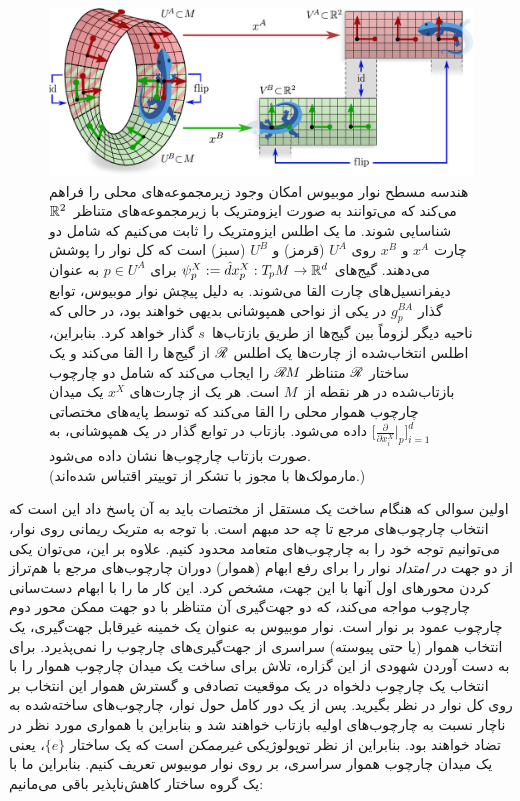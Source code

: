 \begin{figure}[H]
	\centering
	\includegraphics[width=\columnwidth]{figures/mobius_conv_gauges.pdf}
	\vspace*{.5ex}
	\caption{\small
		هندسه مسطح نوار موبیوس امکان وجود زیرمجموعه‌های محلی را فراهم می‌کند که می‌توانند به صورت ایزومتریک با زیرمجموعه‌های متناظر~$\mathbb{R}^2$ شناسایی شوند.
		ما یک اطلس ایزومتریک را ثابت می‌کنیم که شامل دو چارت $x^A$ و $x^B$ روی $U^A$ (قرمز) و $U^B$ (سبز) است که کل نوار را پوشش می‌دهند.
		گیج‌های $\psi_p^X := \hat{d}x_p^X: T_{\mkern-1.5mu p}\mkern-.5muM \to \mathbb{R}^d$ برای $p\in U^A$ به عنوان دیفرانسیل‌های چارت القا می‌شوند.
		به دلیل پیچش نوار موبیوس، توابع گذار $g_p^{BA}$ در یکی از نواحی همپوشانی بدیهی خواهند بود، در حالی که ناحیه دیگر لزوماً بین گیج‌ها از طریق بازتاب‌ها~$s$ گذار خواهد کرد.
		بنابراین، اطلس انتخاب‌شده از چارت‌ها یک اطلس $\mathscr{R}$ از گیج‌ها را القا می‌کند و یک ساختار $\mathscr{R}$ متناظر $\mathscr{R}\mkern-1.8muM$ را ایجاب می‌کند که شامل دو چارچوب بازتاب‌شده در هر نقطه از~$M$ است.
		هر یک از چارت‌های $x^X$ یک میدان چارچوب هموار محلی را القا می‌کند که توسط پایه‌های مختصاتی
		$\bigl[\frac{\partial}{\partial x_i^X} \big|_p \bigr]_{i=1}^d$ داده می‌شود.
		بازتاب در توابع گذار در یک همپوشانی، به صورت بازتاب چارچوب‌ها نشان داده می‌شود.
		{
			\\ \color{gray} \scriptsize
			(مارمولک‌ها با مجوز \href{https://github.com/twitter/twemoji/blob/gh-pages/LICENSE-GRAPHICS}{} با تشکر از توییتر اقتباس شده‌اند.)
		}
	}
	\label{fig:mobius_conv_gauges}
\end{figure}

اولین سوالی که هنگام ساخت یک \CNN{} مستقل از مختصات باید به آن پاسخ داد این است که انتخاب چارچوب‌های مرجع تا چه حد مبهم است.
با توجه به متریک ریمانی روی نوار، می‌توانیم توجه خود را به چارچوب‌های متعامد محدود کنیم.
علاوه بر این، می‌توان یکی از دو جهت \emph{در امتداد} نوار را برای رفع ابهام (هموار) دوران چارچوب‌های مرجع با هم‌تراز کردن محورهای اول آنها با این جهت، مشخص کرد.
این کار ما را با ابهام دست‌سانی چارچوب مواجه می‌کند، که دو جهت‌گیری آن متناظر با دو جهت ممکن محور دوم چارچوب عمود بر نوار است.
نوار موبیوس به عنوان یک خمینه غیرقابل جهت‌گیری، یک انتخاب هموار (یا حتی پیوسته) سراسری از جهت‌گیری‌های چارچوب را نمی‌پذیرد.
برای به دست آوردن شهودی از این گزاره، تلاش برای ساخت یک میدان چارچوب هموار را با انتخاب یک چارچوب دلخواه در یک موقعیت تصادفی و گسترش هموار این انتخاب بر روی کل نوار در نظر بگیرید.
پس از یک دور کامل حول نوار، چارچوب‌های ساخته‌شده به ناچار نسبت به چارچوب‌های اولیه بازتاب خواهند شد و بنابراین با همواری مورد نظر در تضاد خواهند بود.
بنابراین از نظر توپولوژیکی \emph{غیرممکن} است که یک ساختار $\{e\}$، یعنی یک میدان چارچوب هموار سراسری، بر روی نوار موبیوس تعریف کنیم.
بنابراین ما با یک گروه ساختار کاهش‌ناپذیر باقی می‌مانیم:

